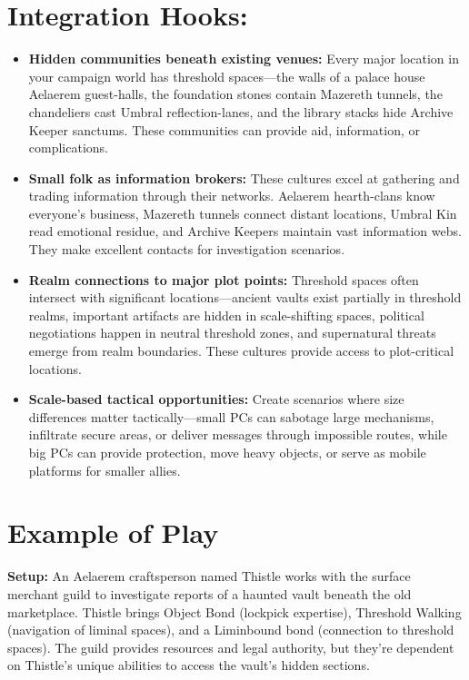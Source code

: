\documentclass[11pt]{book}
\begin{document}
\section*{Integration Hooks:}
\begin{itemize}[leftmargin=*]
\item \textbf{Hidden communities beneath existing venues:} Every major location in your campaign world has threshold spaces---the walls of a palace house Aelaerem guest-halls, the foundation stones contain Mazereth tunnels, the chandeliers cast Umbral reflection-lanes, and the library stacks hide Archive Keeper sanctums. These communities can provide aid, information, or complications.
\item \textbf{Small folk as information brokers:} These cultures excel at gathering and trading information through their networks. Aelaerem hearth-clans know everyone's business, Mazereth tunnels connect distant locations, Umbral Kin read emotional residue, and Archive Keepers maintain vast information webs. They make excellent contacts for investigation scenarios.
\item \textbf{Realm connections to major plot points:} Threshold spaces often intersect with significant locations---ancient vaults exist partially in threshold realms, important artifacts are hidden in scale-shifting spaces, political negotiations happen in neutral threshold zones, and supernatural threats emerge from realm boundaries. These cultures provide access to plot-critical locations.
\item \textbf{Scale-based tactical opportunities:} Create scenarios where size differences matter tactically---small PCs can sabotage large mechanisms, infiltrate secure areas, or deliver messages through impossible routes, while big PCs can provide protection, move heavy objects, or serve as mobile platforms for smaller allies.
\end{itemize}

\section{Example of Play}
\textbf{Setup:} An Aelaerem craftsperson named Thistle works with the surface merchant guild to investigate reports of a haunted vault beneath the old marketplace. Thistle brings Object Bond (lockpick expertise), Threshold Walking (navigation of liminal spaces), and a Liminbound bond (connection to threshold spaces). The guild provides resources and legal authority, but they're dependent on Thistle's unique abilities to access the vault's hidden sections.
\end{document}
